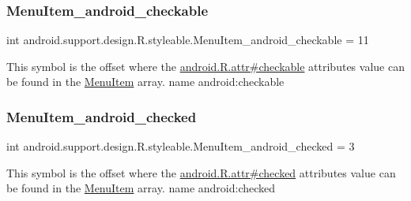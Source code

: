 \subsubsection{\texorpdfstring{Menu\+Item\+\_\+android\+\_\+checkable}{MenuItem\_android\_checkable}}
{\footnotesize\ttfamily int android.\+support.\+design.\+R.\+styleable.\+Menu\+Item\+\_\+android\+\_\+checkable = 11\hspace{0.3cm}{\ttfamily [static]}}

This symbol is the offset where the \hyperlink{}{android.\+R.\+attr\#checkable} attribute\textquotesingle{}s value can be found in the \hyperlink{classandroid_1_1support_1_1design_1_1R_1_1styleable_a4c90afdbb461f2bfba191da26fbc881c}{Menu\+Item} array.  name android\+:checkable \mbox{\label{classandroid_1_1support_1_1design_1_1R_1_1styleable_a6ae0844cc817de9df364dfc0a857a864}} 
\subsubsection{\texorpdfstring{Menu\+Item\+\_\+android\+\_\+checked}{MenuItem\_android\_checked}}
{\footnotesize\ttfamily int android.\+support.\+design.\+R.\+styleable.\+Menu\+Item\+\_\+android\+\_\+checked = 3\hspace{0.3cm}{\ttfamily [static]}}

This symbol is the offset where the \hyperlink{}{android.\+R.\+attr\#checked} attribute\textquotesingle{}s value can be found in the \hyperlink{classandroid_1_1support_1_1design_1_1R_1_1styleable_a4c90afdbb461f2bfba191da26fbc881c}{Menu\+Item} array.  name android\+:checked \mbox{\label{classandroid_1_1support_1_1design_1_1R_1_1styleable_a209d7c1542d115aa9a96d72d2ac3e24b}} 
